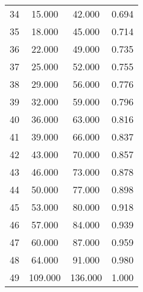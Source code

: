 \begin{tabular}{cccc}
  34 & 15.000 & 42.000 & 0.694 \\ 
  35 & 18.000 & 45.000 & 0.714 \\ 
  36 & 22.000 & 49.000 & 0.735 \\ 
  37 & 25.000 & 52.000 & 0.755 \\ 
  38 & 29.000 & 56.000 & 0.776 \\ 
  39 & 32.000 & 59.000 & 0.796 \\ 
  40 & 36.000 & 63.000 & 0.816 \\ 
  41 & 39.000 & 66.000 & 0.837 \\ 
  42 & 43.000 & 70.000 & 0.857 \\ 
  43 & 46.000 & 73.000 & 0.878 \\ 
  44 & 50.000 & 77.000 & 0.898 \\ 
  45 & 53.000 & 80.000 & 0.918 \\ 
  46 & 57.000 & 84.000 & 0.939 \\ 
  47 & 60.000 & 87.000 & 0.959 \\ 
  48 & 64.000 & 91.000 & 0.980 \\ 
  49 & 109.000 & 136.000 & 1.000 \\ 
   \hline
\end{tabular}
